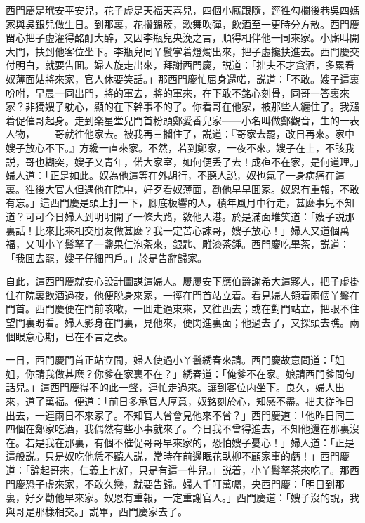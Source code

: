 西門慶是玳安平安兒，花子虚是天福天喜兒，四個小廝跟隨，逕徃勾欄後巷吳四媽家與吳銀兒做生日。到那裏，花攢錦簇，歌舞吹彈，飲酒至一更時分方散。西門慶㽞心把子虚灌得酩酊大醉，又因李瓶兒央浼之言，順得相伴他一同來家。小廝叫開大門，扶到他客位坐下。李瓶兒同丫鬟掌着燈燭出來，把子虚攙扶進去。西門慶交付明白，就要告囬。婦人旋走出來，拜謝西門慶，説道：「拙夫不才貪酒，多累看奴薄面姑將來家，官人休要笑話。」那西門慶忙屈身還喏，説道：「不敢。嫂子這裏吩咐，早晨一同出門，將的軍去，將的軍來，在下敢不銘心刻骨，同哥一答裏來家？非獨嫂子躭心，顯的在下幹事不的了。你看哥在他家，被那些人纏住了。我漒着促催哥起身。走到楽星堂兒門首粉頭鄭愛香兒家——小名叫做鄭觀音，生的一表人物，——哥就徃他家去。被我再三攔住了，説道：『哥家去罷，改日再來。家中嫂子放心不下。』方纔一直來家。不然，若到鄭家，一夜不來。嫂子在上，不該我説，哥也糊突，嫂子又青年，偌大家室，如何便丢了去！成亱不在家，是何道理。」婦人道：「正是如此。奴為他這等在外胡行，不聽人説，奴也氣了一身病痛在這裏。徃後大官人但遇他在院中，好歹看奴薄面，勸他早早囬家。奴恩有重報，不敢有忘。」這西門慶是頭上打一下，腳底板響的人，積年風月中行走，甚麽事兒不知道？可可今日婦人到明明開了一條大路，敎他入港。於是滿面堆笑道：「嫂子説那裏話！比來比來相交朋友做甚麽？我一定苦心諫哥，嫂子放心！」婦人又道個萬福，又叫小丫鬟拏了一盞果仁泡茶來，銀匙、雕漆茶鍾。西門慶吃畢茶，説道：「我囬去罷，嫂子仔細門戶。」於是告辭歸家。

自此，這西門慶就安心設計圖謀這婦人。屢屢安下應伯爵謝希大這夥人，把子虚掛住在院裏飲酒過夜，他便脱身來家，一徑在門首站立着。看見婦人領着兩個丫鬟在門首。西門慶便在門前咳嗽，一囬走過東來，又徃西去；或在對門站立，把眼不住望門裏盼看。婦人影身在門裏，見他來，便閃進裏面；他過去了，又探頭去瞧。兩個眼意心期，已在不言之表。

一日，西門慶門首正站立間，婦人使過小丫鬟綉春來請。西門慶故意問道：「姐姐，你請我做甚麽？你爹在家裏不在？」綉春道：「俺爹不在家。娘請西門爹問句話兒。」這西門慶得不的此一聲，連忙走過來。讓到客位内坐下。良久，婦人出來，道了萬福。便道：「前日多承官人厚意，奴銘刻於心，知感不盡。拙夫従昨日出去，一連兩日不來家了。不知官人曾會見他來不曾？」西門慶道：「他昨日同三四個在鄭家吃酒，我偶然有些小事就來了。今日我不曾得進去，不知他還在那裏沒在。若是我在那裏，有個不催促哥哥早來家的，恐怕嫂子憂心！」婦人道：「正是這般説。只是奴吃他恁不聽人説，常時在前邊眠花臥柳不顧家事的虧！」西門慶道：「論起哥來，仁義上也好，只是有這一件兒。」説着，小丫鬟拏茶來吃了。那西門慶恐子虚來家，不敢久戀，就要告歸。婦人千叮萬囑，央西門慶：「明日到那裏，好歹勸他早來家。奴恩有重報，一定重謝官人。」西門慶道：「嫂子沒的說，我與哥是那樣相交。」説畢，西門慶家去了。

